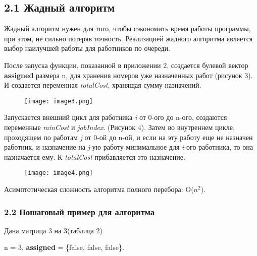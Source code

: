 \documentclass[]{article}
\begin{document}
\hypertarget{Жадный алгоритм}{%
\subsection{2.1 Жадный
алгоритм}\label{Жадный алгоритм}}

Жадный алгоритм нужен для того, чтобы сэкономить время работы программы,
при этом, не сильно потеряв точность. Реализацией жадного алгоритма
является выбор наилучшей работы для работников по очереди.

После запуска функции, показанной в приложении 2, создается булевой
вектор \textbf{assigned} размера n, для хранения номеров уже назначенных
работ (рисунок 3). И создается переменная \emph{totalCost}, хранящая
сумму назначений.


\begin{figure}
    \centering
    \texttt{[image: image3.png]}
    \caption{}
    \label{fig:enter-label}
\end{figure}

Запускается внешний цикл для работника \emph{i} от 0-ого до n-ого,
создаются переменные \emph{minCost} и \emph{jobIndex}. (Рисунок 4).
Затем во внутреннем цикле, проходящем по работам \emph{j} от 0-ой до
n-ой, и если на эту работу еще не назначен работник, и назначение на
\emph{j}-ую работу минимальное для \emph{i}-ого работника, то она
назначается ему. К \emph{totalCost} прибавляется это назначение.

\begin{figure}
    \centering
    \texttt{[image: image4.png]}
    \caption{}
    \label{fig:enter-label}
\end{figure}
\newpage

Асимптотическая сложность алгоритма полного перебора: O(\(n^{2}\)).

\hypertarget{ПошаговыйЖА}{%
\subsubsection{\texorpdfstring{\textbf{2.2 Пошаговый пример для
алгоритма}}{2.2 Пошаговый пример для алгоритма}}\label{ПошаговыйЖА}}

Дана матрица 3 на 3(таблица 2)

n = 3, \textbf{assigned} = \{false, false, false\}.
\end{document}

